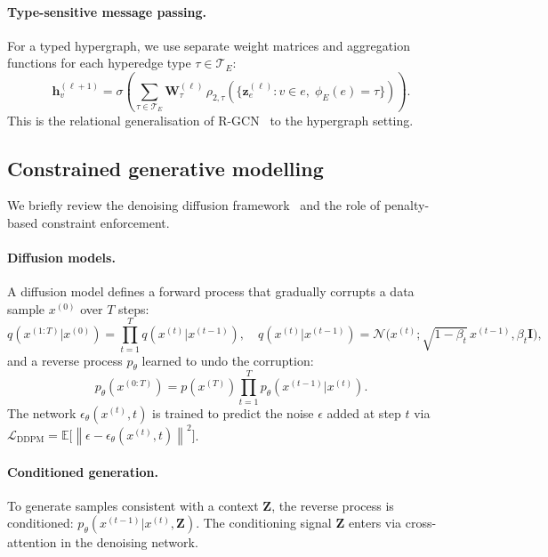 \documentclass[11pt,a4paper]{article}
\theoremstyle{plain}
\theoremstyle{definition}
\theoremstyle{remark}
\newcommand{\norm}[1]{\left\lVert #1 \right\rVert}
\newcommand{\E}{\mathbb{E}}
\newcommand{\Te}{\mathcal{T}_E}
\newcommand{\hvec}{\mathbf{h}}
\begin{document}
\paragraph{Type-sensitive message passing.}
For a typed hypergraph, we use separate weight matrices and
aggregation functions for each hyperedge type $\tau \in \Te$:
\begin{equation}
  \hvec_v^{(\ell+1)}
  = \sigma\!\left(\sum_{\tau \in \Te}
    \mathbf{W}_\tau^{(\ell)}\,
    \rho_{2,\tau}\!\!\left(\bigl\{
      \mathbf{z}_e^{(\ell)} : v \in e,\;
      \phi_E(e) = \tau
    \bigr\}\right)
  \right).
  \label{eq:typed_hgnn}
\end{equation}
This is the relational generalisation of R-GCN~\cite{schlichtkrull2018modeling}
to the hypergraph setting.

\subsection{Constrained generative modelling}
\label{sec:prelim_gen}

We briefly review the denoising diffusion framework~\cite{ho2020ddpm}
and the role of penalty-based constraint enforcement.

\paragraph{Diffusion models.}
A diffusion model defines a forward process that gradually corrupts
a data sample $x^{(0)}$ over $T$ steps:
\[
  q(x^{(1:T)} | x^{(0)})
  = \prod_{t=1}^{T} q(x^{(t)} | x^{(t-1)}),
  \quad
  q(x^{(t)} | x^{(t-1)}) = \mathcal{N}\!\bigl(x^{(t)};
  \sqrt{1-\beta_t}\,x^{(t-1)}, \beta_t \mathbf{I}\bigr),
\]
and a reverse process $p_\theta$ learned to undo the corruption:
\[
  p_\theta(x^{(0:T)})
  = p(x^{(T)})\prod_{t=1}^{T} p_\theta(x^{(t-1)}|x^{(t)}).
\]
The network $\epsilon_\theta(x^{(t)}, t)$ is trained to predict the
noise $\epsilon$ added at step $t$ via
$\mathcal{L}_{\mathrm{DDPM}} = \E\bigl[\norm{\epsilon -
\epsilon_\theta(x^{(t)}, t)}^2\bigr]$.

\paragraph{Conditioned generation.}
To generate samples consistent with a context $\mathbf{Z}$, the reverse
process is conditioned: $p_\theta(x^{(t-1)} | x^{(t)}, \mathbf{Z})$.
The conditioning signal $\mathbf{Z}$ enters via cross-attention in
the denoising network.
\end{document}
